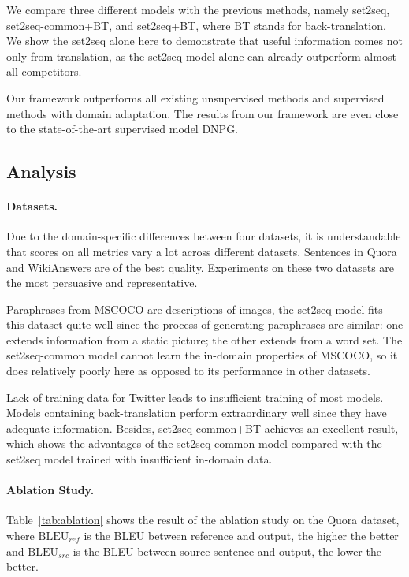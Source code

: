 We compare three different models with the previous methods, 
namely set2seq, set2seq-common+BT, and set2seq+BT, where BT stands for 
back-translation. We show the set2seq alone here to demonstrate that
useful information comes not only from translation, as the
set2seq model alone can already outperform almost all competitors. 

Our framework outperforms all existing unsupervised methods and supervised methods with domain adaptation. The results from our framework are even close to the state-of-the-art supervised model DNPG. 

\subsection{Analysis} \label{sec:analysis}
\paragraph{Datasets. } Due to the domain-specific differences between four datasets, it is understandable that scores on all metrics vary a lot across different datasets. Sentences in Quora and WikiAnswers are of the best quality.
Experiments on these two datasets are the most persuasive and representative.

Paraphrases from MSCOCO are descriptions of images, the set2seq model fits this dataset quite well since the process of generating paraphrases are similar: 
one extends information from a static picture; 
the other extends from a word set. 
The set2seq-common model cannot learn the in-domain properties of MSCOCO, 
so it does relatively poorly here as opposed to its performance 
in other datasets. 

Lack of training data for Twitter leads to insufficient training of most models. Models containing back-translation perform extraordinary well since they have adequate information. Besides, set2seq-common+BT achieves an excellent result, which shows the advantages of the set2seq-common model compared with the set2seq model trained with insufficient in-domain data.

\paragraph{Ablation Study. }

Table~\ref{tab:ablation} shows the result of the ablation study on the Quora dataset, where $\text{BLEU}_{ref}$ is the BLEU between reference and output, the higher the better and $\text{BLEU}_{src}$ is the BLEU between source sentence and output, the lower the better. 

